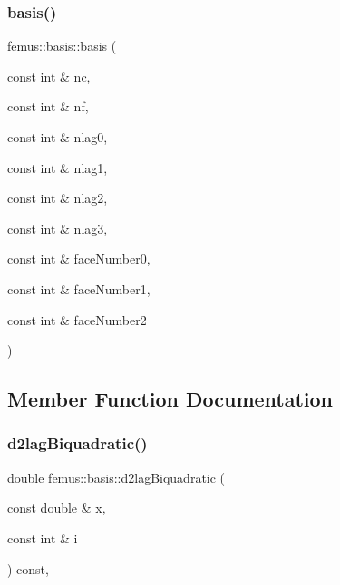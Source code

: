 \subsubsection{\texorpdfstring{basis()}{basis()}}
{\footnotesize\ttfamily femus\+::basis\+::basis (\begin{DoxyParamCaption}\item[{const int \&}]{nc,  }\item[{const int \&}]{nf,  }\item[{const int \&}]{nlag0,  }\item[{const int \&}]{nlag1,  }\item[{const int \&}]{nlag2,  }\item[{const int \&}]{nlag3,  }\item[{const int \&}]{face\+Number0,  }\item[{const int \&}]{face\+Number1,  }\item[{const int \&}]{face\+Number2 }\end{DoxyParamCaption})\hspace{0.3cm}{\ttfamily [inline]}}



\subsection{Member Function Documentation}
\mbox{\label{classfemus_1_1basis_a52634884baf22e8f65808ee0eca3e9b8}} 
\subsubsection{\texorpdfstring{d2lag\+Biquadratic()}{d2lagBiquadratic()}}
{\footnotesize\ttfamily double femus\+::basis\+::d2lag\+Biquadratic (\begin{DoxyParamCaption}\item[{const double \&}]{x,  }\item[{const int \&}]{i }\end{DoxyParamCaption}) const\hspace{0.3cm}{\ttfamily [inline]}, {\ttfamily [protected]}}

\mbox{\label{classfemus_1_1basis_a1c4544031232a6ae1cb0f8501d650758}} 
